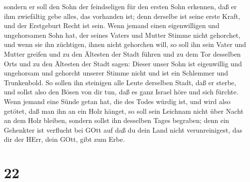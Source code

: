 sondern er soll den Sohn der feindseligen für den ersten Sohn erkennen,
daß er ihm zwiefältig gebe alles, das vorhanden ist; denn derselbe ist
seine erste Kraft, und der Erstgeburt Recht ist sein.  Wenn
jemand einen eigenwilligen und ungehorsamen Sohn hat, der seines Vaters
und Mutter Stimme nicht gehorchet, und wenn sie ihn züchtigen, ihnen
nicht gehorchen will,  so soll ihn sein Vater und Mutter
greifen und zu den Ältesten der Stadt führen und zu dem Tor desselben
Orts  und zu den Ältesten der Stadt sagen: Dieser unser
Sohn ist eigenwillig und ungehorsam und gehorcht unserer Stimme nicht
und ist ein Schlemmer und Trunkenbold.  So sollen ihn
steinigen alle Leute derselben Stadt, daß er sterbe, und sollst also den
Bösen von dir tun, daß es ganz Israel höre und sich fürchte.
 Wenn jemand eine Sünde getan hat, die des Todes würdig
ist, und wird also getötet, daß man ihn an ein Holz hänget,
 so soll sein Leichnam nicht über Nacht an dem Holz
bleiben, sondern sollst ihn desselben Tages begraben; denn ein Gehenkter
ist verflucht bei GOtt auf daß du dein Land nicht verunreinigest, das
dir der HErr, dein GOtt, gibt zum Erbe.

\hypertarget{section-21}{%
\section{22}\label{section-21}}

